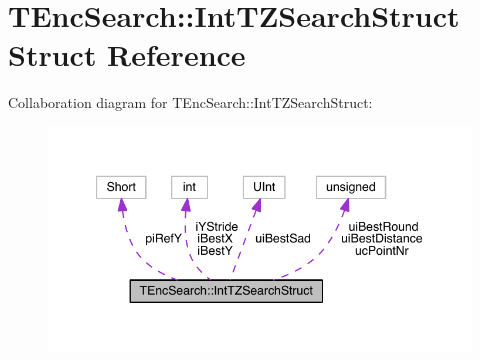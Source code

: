 \hypertarget{struct_t_enc_search_1_1_int_t_z_search_struct}{}\section{T\+Enc\+Search\+:\+:Int\+T\+Z\+Search\+Struct Struct Reference}
\label{struct_t_enc_search_1_1_int_t_z_search_struct}


Collaboration diagram for T\+Enc\+Search\+:\+:Int\+T\+Z\+Search\+Struct\+:
\nopagebreak
\begin{figure}[H]
\begin{center}
\leavevmode
\includegraphics[width=347pt]{d4/ddb/struct_t_enc_search_1_1_int_t_z_search_struct__coll__graph}
\end{center}
\end{figure}
